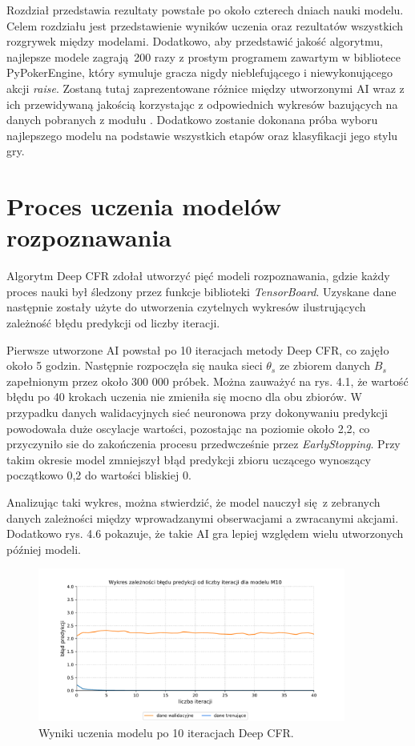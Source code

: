\documentclass[12pt,oneside,a4paper]{report}
\begin{document}
Rozdział przedstawia rezultaty powstałe po około czterech dniach nauki modelu. Celem rozdziału jest 
przedstawienie wyników uczenia oraz rezultatów
wszystkich rozgrywek między modelami.
Dodatkowo, aby przedstawić jakość algorytmu, najlepsze modele zagrają 200 razy z prostym
programem zawartym w bibliotece PyPokerEngine, który symuluje
gracza nigdy nieblefującego i niewykonującego akcji \emph{raise}.
Zostaną tutaj zaprezentowane różnice między utworzonymi AI wraz z ich przewidywaną jakością
korzystając z odpowiednich wykresów bazujących na danych pobranych z modułu . 
Dodatkowo zostanie dokonana próba wyboru najlepszego modelu na podstawie
wszystkich etapów oraz klasyfikacji jego stylu gry.

\section{Proces uczenia modelów rozpoznawania}

Algorytm Deep CFR zdołał utworzyć pięć modeli rozpoznawania, gdzie każdy proces nauki
był
śledzony przez funkcje biblioteki \emph{TensorBoard}. Uzyskane dane następnie zostały
użyte do utworzenia czytelnych wykresów ilustrujących zależność błędu predykcji od liczby
iteracji.

Pierwsze utworzone AI powstał po 10 iteracjach metody Deep CFR, co zajęło około 5 godzin.
Następnie rozpoczęła się nauka sieci $\theta_{s}$ ze zbiorem danych $B_{s}$ zapełnionym przez około 300 000 próbek.
Można zauważyć na rys. 4.1,
że wartość błędu po 40 krokach uczenia nie zmieniła się mocno dla obu zbiorów.
W przypadku danych walidacyjnych sieć neuronowa przy dokonywaniu predykcji powodowała duże oscylacje
wartości, pozostając na poziomie około 2,2, co przyczyniło sie do zakończenia procesu przedwcześnie przez \emph{EarlyStopping}.
Przy takim okresie model zmniejszył błąd predykcji zbioru uczącego wynoszący początkowo 0,2 do wartości bliskiej 0.

Analizując taki wykres, można stwierdzić, że model nauczył się z zebranych danych zależności między
wprowadzanymi obserwacjami a zwracanymi akcjami. Dodatkowo rys. 4.6 pokazuje, że takie AI gra lepiej
względem wielu utworzonych później modeli.


\begin{figure}[!ht]
  \centering
  \includegraphics[width=0.9\textwidth]{./img/model1.pdf}
\caption{Wyniki uczenia modelu po 10 iteracjach Deep CFR.}
\end{figure}
\end{document}
